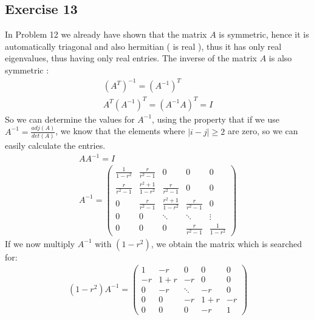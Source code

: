\subsection{Exercise 13}
In Problem 12 we already have shown that the matrix $A$ is symmetric, hence it is automatically triagonal and also hermitian ( is real ), thus it has only real eigenvalues, thus having only real entries. 
The inverse of the matrix $A$ is also symmetric :
\begin{gather*}
(A^T)^{-1} = (A^{-1})^T \\
A^T(A^{-1})^T=(A^{-1}A)^T=I
\end{gather*}
So we can determine the values for $A^{-1}$, using the property that if we use $A^{-1} = \frac{adj(A)}{det(A)}$, we know that the elements where $|i-j| \geq 2$ are zero, so we can easily calculate the entries.
\begin{gather*}
A A^{-1} = I \\
A^{-1} = \left(\begin{array}{ccccc}
\frac{1}{1-r^2} & \frac{r}{r^2-1} & 0 & 0 & 0\\
\frac{r}{r^2-1}  & \frac{r^2+1}{1-r^2} & \frac{r}{r^2-1} & 0 & 0\\
0 &\frac{r}{r^2-1}  & \frac{r^2+1}{1-r^2} & \frac{r}{r^2-1} & 0 \\
0 & 0 & \ddots & \ddots & \vdots \\
0 & 0 & 0 & \frac{r}{r^2-1} & \frac{1}{1-r^2}
\end{array} \right)
\end{gather*}
If we now multiply $A^{-1}$ with $(1-r^2)$, we obtain the matrix which is searched for:
\begin{gather*}
(1-r^2) A^{-1} =  \left(\begin{array}{ccccc}
1 & -r & 0 & 0 & 0 \\
-r & 1+r & -r & 0 & 0\\
0 & -r & \ddots & -r & 0 \\
0 & 0 & -r & 1+r & -r\\
0 & 0 & 0 & -r & 1
\end{array} \right)
\end{gather*}

